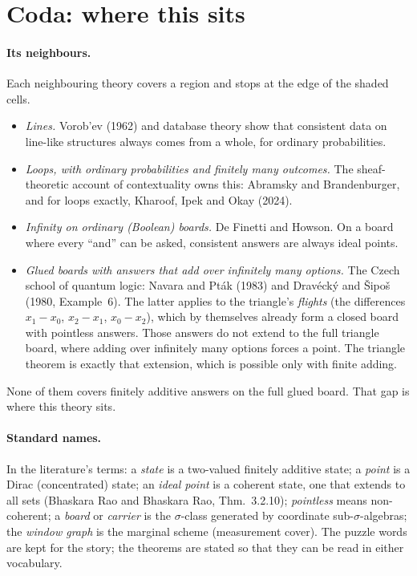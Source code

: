 \documentclass[11pt]{article}
\theoremstyle{plain}
\theoremstyle{definition}
\begin{document}
\section{Coda: where this sits}\label{sec:coda}

\paragraph{Its neighbours.} Each neighbouring theory covers a region and stops
at the edge of the shaded cells.
\begin{itemize}[nosep]
  \item \emph{Lines.} Vorob'ev (1962) and database theory show that consistent
    data on line-like structures always comes from a whole, for ordinary
    probabilities.
  \item \emph{Loops, with ordinary probabilities and finitely many outcomes.}
    The sheaf-theoretic account of contextuality owns this: Abramsky and
    Brandenburger, and for loops exactly, Kharoof, Ipek and Okay (2024).
  \item \emph{Infinity on ordinary (Boolean) boards.} De Finetti and Howson. On
    a board where every ``and'' can be asked, consistent answers are always ideal
    points.
  \item \emph{Glued boards with answers that add over infinitely many options.}
    The Czech school of quantum logic: Navara and Pt\'ak (1983) and
    Drav\'eck\'y and \v{S}ipo\v{s} (1980, Example~6). The latter applies to the
    triangle's \emph{flights} (the differences $x_1-x_0$, $x_2-x_1$,
    $x_0-x_2$), which by themselves already form a closed board with pointless
    answers. Those answers do not extend to the full triangle board, where
    adding over infinitely many options forces a point. The triangle theorem is
    exactly that extension, which is possible only with finite adding.
\end{itemize}
None of them covers finitely additive answers on the full glued board. That gap is
where this theory sits.

\paragraph{Standard names.} In the literature's terms: a \emph{state} is a
two-valued finitely additive state; a \emph{point} is a Dirac (concentrated)
state; an \emph{ideal point} is a coherent state, one that extends to all sets
(Bhaskara Rao and Bhaskara Rao, Thm.~3.2.10); \emph{pointless} means
non-coherent; a \emph{board} or \emph{carrier} is the $\sigma$-class generated by
coordinate sub-$\sigma$-algebras; the \emph{window graph} is the marginal scheme
(measurement cover). The puzzle words are kept for the story; the theorems are
stated so that they can be read in either vocabulary.
\end{document}

